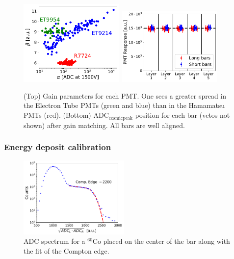 \documentclass[review,number,sort&compress]{elsarticle}
\begin{document}
\begin{figure}[tb]
	\centering
			\includegraphics[width=0.46\textwidth]{fig16a-gainspread.pdf}
			\includegraphics[width=0.46\textwidth]{fig16b-adcresponse.pdf}
		
		\caption{ (Top) Gain parameters for each PMT. One sees a greater spread in the Electron Tube PMTs (green and blue) than in the Hamamatsu PMTs (red). (Bottom) $\mathrm{ADC}_{\mathrm{cosmic peak}}$ position for each bar (vetos not shown) after gain matching. All bars are well aligned.}
		\label{fig:hv_settings}
\end{figure}

\subsubsection{Energy deposit calibration}
\label{sec:energydeposit}
\begin{figure}[tbh!]
	\centering
		\includegraphics[width=0.48\textwidth]{fig17-cobaltfit.pdf}
		\caption{ADC spectrum for a $^{60}$Co placed on the center of the bar along with the fit of the Compton edge.}
	\label{fig:compton_edge}
\end{figure}
\end{document}
